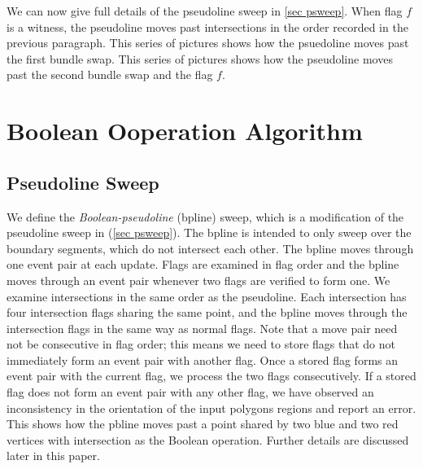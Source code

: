 \documentclass[11pt]{article}
\begin{document}
We can now give full details of the pseudoline sweep in \ref{sec psweep}.
When flag $f$ is a witness, the pseudoline moves past intersections in the order recorded in the previous paragraph.
This series of pictures shows how the psuedoline moves past the first bundle swap.
This series of pictures shows how the pseudoline moves past the second bundle swap and the flag $f$.

\section{Boolean Ooperation Algorithm}
\subsection{Pseudoline Sweep} \label{sec psweep2}
We define the \textit{Boolean-pseudoline} (bpline) sweep, which is a modification of the pseudoline sweep in (\ref{sec psweep}).
The bpline is intended to only sweep over the boundary segments, which do not intersect each other.
The bpline moves through one event pair at each update.
Flags are examined in flag order and the bpline moves through an event pair whenever two flags are verified to form one.
We examine intersections in the same order as the pseudoline.
Each intersection has four intersection flags sharing the same point, and the bpline moves through the intersection flags in the same way as normal flags.
Note that a move pair need not be consecutive in flag order; this means we need to store flags that do not immediately form an event pair with another flag.
Once a stored flag forms an event pair with the current flag, we process the two flags consecutively.
If a stored flag does not form an event pair with any other flag, we have observed an inconsistency in the orientation of the input polygons regions and report an error.
This shows how the pbline moves past a point shared by two blue and two red vertices with intersection as the Boolean operation.
Further details are discussed later in this paper.



\end{document}
